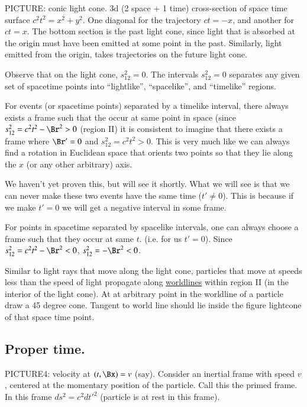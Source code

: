 PICTURE: conic light cone.  3d (2 space + 1 time) cross-section of space time surface $c^2 t^2 = x^2 + y^2$.  One diagonal for the trajectory $ct = -x$, and another for $ct = x$.  The bottom section is the past light cone, since light that is absorbed at the origin must have been emitted at some point in the past.  Similarly, light emitted from the origin, takes trajectories on the future light cone.

Observe that on the light cone, $s_{12}^2 = 0$.  The intervals $s_{12}^2 = 0$ separates any given set of spacetime points into ``lightlike'', ``spacelike'', and ``timelike'' regions.

For events (or spacetime points) separated by a timelike interval, there always exists a frame such that the occur at same point in space (since $s_{12}^2 = c^2 t^2 - \Br^2 > 0$ (region II) it is consistent to imagine that there exists a frame where $\Br' = 0$ and $s_{12}^2 = c^2 t^2 > 0$.  This is very much like we can always find a rotation in Euclidean space that orients two points so that they lie along the $x$ (or any other arbitrary) axis.

We haven't yet proven this, but will see it shortly.  What we will see is that we can never make these two events have the same time ($t' \ne 0$).  This is because if we make $t' = 0$ we will get a negative interval in some frame.

For points in spacetime separated by spacelike intervals, one can always choose a frame such that they occur at same $t$.  (i.e. for us $t' = 0$).  Since $s_{12}^2 = c^2 t^2 - \Br^2 < 0$, $s_{12}^2 = -\Br^2 < 0$.

Similar to light rays that move along the light cone, particles that move at speeds less than the speed of light propagate along \underline{worldlines} within region II (in the interior of the light cone).  At at arbitrary point in the worldline of a particle draw a 45 degree cone.  Tangent to world line should lie inside the figure lightcone of that space time point.

\subsection{Proper time.}

PICTURE4: velocity at $(t, \Bx) = v$ (say).  Consider an inertial frame with speed $v$, centered at the momentary position of the particle.  Call this the primed frame.  In this frame $ds^2 = c^2 {dt'}^2$ (particle is at rest in this frame).

